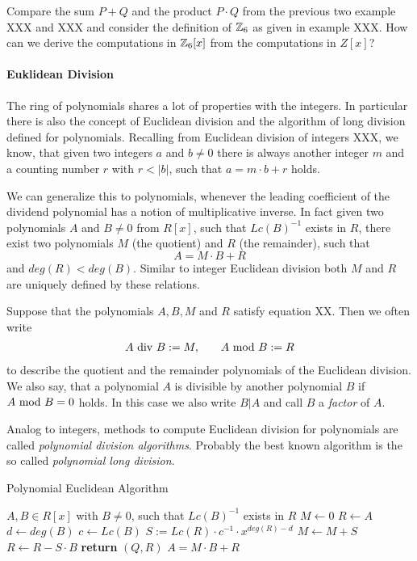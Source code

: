 \begin{exercise}
Compare the sum $P+Q$ and the product $P\cdot Q$ from the previous two example XXX and XXX and consider the definition of $\mathbb{Z}_6$ as given in example XXX. How can we derive the computations in $\mathbb{Z}_6[x]$ from the computations in $Z[x]$? 
\end{exercise}
\paragraph{Euklidean Division}
The ring of polynomials shares a lot of properties with the integers. In particular there is also the concept of Euclidean division and the algorithm of long division defined for polynomials. Recalling from Euclidean division of integers XXX, we know, that given two integers $a$ and $b\neq 0$ there is always another integer $m$ and a counting number $r$ with $r<|b|$, such that $a = m\cdot b +r$ holds.

We can generalize this to polynomials, whenever the leading coefficient of the dividend polynomial has a notion of multiplicative inverse. In fact given two polynomials $A$ and $B\neq 0$ from $R[x]$, such that $Lc(B)^{-1}$ exists in $R$, there exist two polynomials $M$ (the quotient) and $R$ (the remainder), such that
\begin{equation}
A = M\cdot B + R
\end{equation}
and $deg(R) < deg(B)$. Similar to integer Euclidean division both $M$ and $R$ are uniquely defined by these relations. 
\begin{notation}
\label{eq_polynomial_euklidean_division_notation}
Suppose that the polynomials $ A, B, M $ and $ R $ satisfy equation XX. Then we often write 
\begin{equation}
\label{def_integer_division_and_modulus}
\begin{array}{lcr}
A \text{ div } B: = M, & & A \text{ mod } B: = R 
\end{array}
\end{equation}
to describe the quotient and the remainder polynomials of the Euclidean division. We also say, that a polynomial $ A $ is divisible by another polynomial $ B $ if $ A \text{ mod } B = 0 $ holds. In this case we also write $ B | A $ and call $B$ a \textit{factor} of $A$.
\end{notation}
Analog to integers, methods to compute Euclidean division for polynomials are called \textit{polynomial division algorithms}. Probably the best known algorithm is the so called \textit{polynomial long division}. 
\begin{algorithm}\caption{Polynomial Euclidean Algorithm}
\label{alg_ext_euclid_alg}
\begin{algorithmic}[0]
\Require $A,B \in R[x]$ with $B\neq 0$, such that $Lc(B)^{-1}$ exists in $R$
\State $M \gets 0$
\State $R \gets A$
\State $d \gets deg(B)$
\State $c \gets Lc(B)$
\State  $S := Lc(R)\cdot c^{-1}\cdot x^{deg(R)-d}$
\State $M \gets M + S$
\State $R \gets R - S\cdot B$
\EndWhile
\State \textbf{return} $(Q, R)$ 
\EndProcedure
\Ensure $ A=  M \cdot B + R$
\end{algorithmic}
\end{algorithm}

